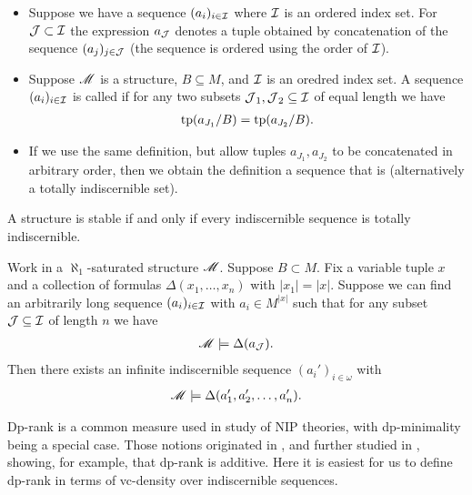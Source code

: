 \begin{Definition}
  \begin{itemize}
  \item Suppose we have a sequence $(a_i)_{i \in \operatorname{\mathcal I}}$ where $\operatorname{\mathcal I}$ is an ordered index set.
    For $\operatorname{\mathcal J} \subset \operatorname{\mathcal I}$ the expression $a_{\operatorname{\mathcal J}}$ denotes  a tuple obtained by concatenation of the sequence $(a_j)_{j \in \operatorname{\mathcal J}}$
    (the sequence is ordered using the order of $\operatorname{\mathcal I}$).    
  \item Suppose $\mathscr M$ is a structure, $B \subseteq M$, and $\operatorname{\mathcal I}$ is an oredred index set. 
    A sequence $(a_i)_{i \in \operatorname{\mathcal I}}$ is called  if
    for any two subsets $\operatorname{\mathcal J}_1, \operatorname{\mathcal J}_2 \subseteq \operatorname{\mathcal I}$ of equal length we have 
    \begin{align*}
      \operatorname{tp}(a_{J_1}/B) = \operatorname{tp}(a_{J_2}/B).
    \end{align*}
  \item If we use the same definition, but allow tuples $a_{J_1}, a_{J_2}$ to be concatenated in arbitrary order,
    then we obtain the definition a sequence that is  (alternatively a totally indiscernible set).
  \end{itemize}
\end{Definition}

\begin{Lemma}
  A structure is stable if and only if every indiscernible sequence is totally indiscernible.
\end{Lemma}

\begin{Lemma}
  Work in a $\aleph_1$-saturated structure $\mathscr M$.
  Suppose $B \subset M$.
  Fix a variable tuple $x$ and a collection of formulas $\Delta(x_1, \ldots, x_n)$ with $|x_1| = |x|$.
  Suppose we can find an arbitrarily long sequence $(a_i)_{i \in \operatorname{\mathcal I}}$ with $a_i \in M^{|x|}$ such that
  for any subset $\operatorname{\mathcal J} \subseteq \operatorname{\mathcal I}$ of length $n$ we have
  \begin{align*}
    \mathscr M \models \Delta(a_{\operatorname{\mathcal J}}).
  \end{align*}
  Then there exists an infinite indiscernible sequence $(a_i')_{i \in \omega}$ with
  \begin{align*}
    \mathscr M \models \Delta(a_1', a_2', \ldots, a_n').
  \end{align*}
\end{Lemma}



Dp-rank is a common measure used in study of NIP theories, with dp-minimality being a special case.
Those notions originated in \cite{shelah_dp}, and further studied in \cite{dp_add}, showing, for example, that dp-rank is additive.
Here it is easiest for us to define dp-rank in terms of vc-density over indiscernible sequences.

